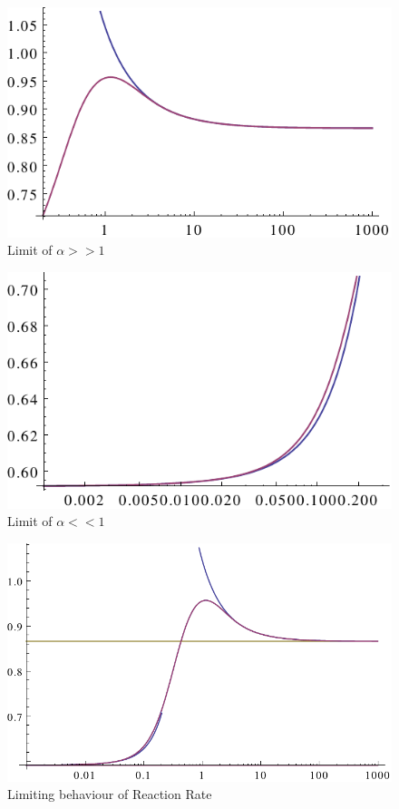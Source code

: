 \begin{minipage}[t]{0.5 \textwidth}
    \begin{figure}[H]
        \includegraphics[width = 1 \textwidth]{plots/largelimit.pdf}
    \caption{Limit of $\alpha >>1$}
    \end{figure}
\end{minipage}\begin{minipage}[t]{0.49 \textwidth}
    \begin{figure}[H]
        \includegraphics[width = 1 \textwidth]{plots/smalllimit.pdf}
    \caption{Limit of $\alpha <<1$}
    \end{figure}
\end{minipage}
\begin{figure}[H]
    \centering
    \includegraphics[width = 1 \textwidth]{plots/bothlimits.pdf}
    \caption{Limiting behaviour of Reaction Rate}
    \label{fig:rrlimit}
\end{figure}
